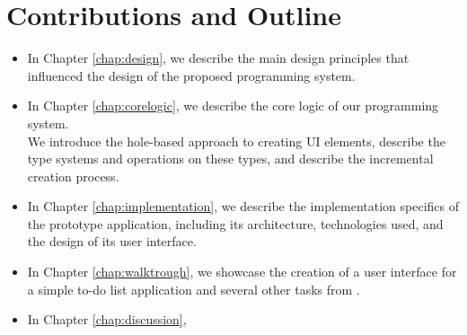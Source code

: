 \section* {Contributions and Outline}
\begin{itemize}
	\item In Chapter \ref{chap:design}, we describe the main design principles that influenced the design of the proposed programming system.
	\item {In Chapter \ref{chap:corelogic}, we describe the core logic of our programming system.\\
	      We introduce the hole-based approach to creating UI elements, describe the type systems and operations on these types,
	      and describe the incremental creation process.}
	\item In Chapter \ref{chap:implementation}, we describe the implementation specifics of the prototype application, including its architecture, technologies used, and the design of its user interface.
	\item In Chapter \ref{chap:walktrough}, we showcase the creation of a user interface for a simple to-do list application and several other tasks from \citet{7GUIs-web}.
	\item In Chapter \ref{chap:discussion}, 
\end{itemize}
